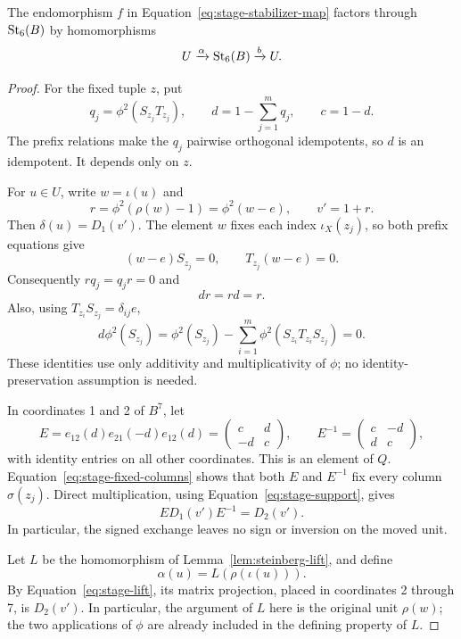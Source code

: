 \begin{lemma}\label{lem:stage-stabilizer-factor}
The endomorphism $f$ in
Equation~\eqref{eq:stage-stabilizer-map} factors through
$\mathrm{St}_6(B)$ by homomorphisms
\[
 U\xrightarrow{\alpha}\mathrm{St}_6(B)\xrightarrow{b}U.
\]
\end{lemma}

\begin{proof}
For the fixed tuple $z$, put
\begin{equation}\label{eq:stage-d}
 q_j=\phi^2(S_{z_j}T_{z_j}),
 \qquad d=1-\sum_{j=1}^m q_j,
 \qquad c=1-d.
\end{equation}
The prefix relations make the $q_j$ pairwise orthogonal
idempotents, so $d$ is an idempotent.  It depends only on $z$.

For $u\in U$, write $w=\iota(u)$ and
\[
 r=\phi^2(\rho(w)-1)=\phi^2(w-e),
 \qquad v'=1+r.
\]
Then $\delta(u)=D_1(v')$.  The element $w$ fixes each index
$\iota_X(z_j)$, so both prefix equations give
\[
 (w-e)S_{z_j}=0,
 \qquad T_{z_j}(w-e)=0.
\]
Consequently $rq_j=q_jr=0$ and
\begin{equation}\label{eq:stage-support}
 dr=rd=r.
\end{equation}
Also, using $T_{z_i}S_{z_j}=\delta_{ij}e$,
\begin{equation}\label{eq:stage-fixed-columns}
 d\phi^2(S_{z_j})
  =\phi^2(S_{z_j})
       -\sum_{i=1}^m\phi^2(S_{z_i}T_{z_i}S_{z_j})=0.
\end{equation}
These identities use only additivity and multiplicativity of $\phi$;
no identity-preservation assumption is needed.

In coordinates 1 and 2 of $B^7$, let
\[
 E=e_{12}(d)e_{21}(-d)e_{12}(d)
   =\begin{pmatrix}c&d\\-d&c\end{pmatrix},
 \qquad
 E^{-1}=\begin{pmatrix}c&-d\\d&c\end{pmatrix},
\]
with identity entries on all other coordinates.  This is an element
of $Q$.  Equation~\eqref{eq:stage-fixed-columns} shows that both
$E$ and $E^{-1}$ fix every column $\sigma(z_j)$.  Direct
multiplication, using Equation~\eqref{eq:stage-support}, gives
\begin{equation}\label{eq:stage-exchange}
 E D_1(v')E^{-1}=D_2(v').
\end{equation}
In particular, the signed exchange leaves no sign or inversion on
the moved unit.

Let $L$ be the homomorphism of Lemma~\ref{lem:steinberg-lift},
and define
\begin{equation}\label{eq:stage-alpha}
 \alpha(u)=L(\rho(\iota(u))).
\end{equation}
By Equation~\eqref{eq:stage-lift}, its matrix projection, placed
in coordinates 2 through 7, is $D_2(v')$.  In particular, the
argument of $L$ here is the original unit $\rho(w)$; the two
applications of $\phi$ are already included in the defining
property of $L$.


\end{proof}
